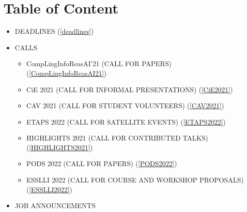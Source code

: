 \documentclass[prodmode,acmtecs]{acmsmall} %
\begin{document}
\section{Table of Content}\begin{itemize}\item DEADLINES (\cref{deadlines}) 
 
\item CALLS 
 
\begin{itemize}\item CompLingInfoReasAI'21 (CALL FOR PAPERS) (\cref{CompLingInfoReasAI21})
\item CiE 2021 (CALL FOR INFORMAL PRESENTATIONS) (\cref{CiE2021})
\item CAV 2021 (CALL FOR STUDENT VOLUNTEERS) (\cref{CAV2021})
\item ETAPS 2022 (CALL FOR SATELLITE EVENTS) (\cref{ETAPS2022})
\item HIGHLIGHTS 2021 (CALL FOR CONTRIBUTED TALKS) (\cref{HIGHLIGHTS2021})
\item PODS 2022 (CALL FOR PAPERS) (\cref{PODS2022})
\item ESSLLI 2022 (CALL FOR COURSE AND WORKSHOP PROPOSALS) (\cref{ESSLLI2022})
\end{itemize} 
\item JOB ANNOUNCEMENTS 
 

\end{itemize}
\end{document}
